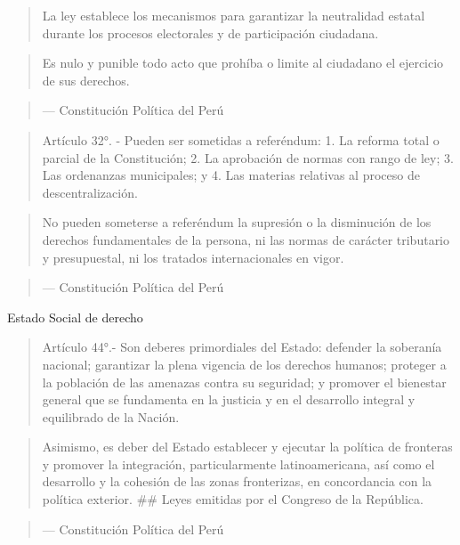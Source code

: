 \documentclass[
]{book}
\begin{document}
\begin{quote}
La ley establece los mecanismos para garantizar la neutralidad estatal durante los
procesos electorales y de participación ciudadana.
\end{quote}

\begin{quote}
Es nulo y punible todo acto que prohíba o limite al ciudadano el ejercicio de sus
derechos.
\end{quote}

\begin{quote}
--- Constitución Política del Perú
\end{quote}

\begin{quote}
Artículo 32°. - Pueden ser sometidas a referéndum:
1. La reforma total o parcial de la Constitución;
2. La aprobación de normas con rango de ley;
3. Las ordenanzas municipales; y
4. Las materias relativas al proceso de descentralización.
\end{quote}

\begin{quote}
No pueden someterse a referéndum la supresión o la disminución de los derechos
fundamentales de la persona, ni las normas de carácter tributario y presupuestal,
ni los tratados internacionales en vigor.
\end{quote}

\begin{quote}
--- Constitución Política del Perú
\end{quote}

Estado Social de derecho

\begin{quote}
Artículo 44°.- Son deberes primordiales del Estado: defender la soberanía
nacional; garantizar la plena vigencia de los derechos humanos; proteger a la
población de las amenazas contra su seguridad; y promover el bienestar general
que se fundamenta en la justicia y en el desarrollo integral y equilibrado de la
Nación.
\end{quote}

\begin{quote}
Asimismo, es deber del Estado establecer y ejecutar la política de fronteras y
promover la integración, particularmente latinoamericana, así como el desarrollo y
la cohesión de las zonas fronterizas, en concordancia con la política exterior.
\#\# Leyes emitidas por el Congreso de la República.
\end{quote}

\begin{quote}
--- Constitución Política del Perú
\end{quote}
\end{document}
